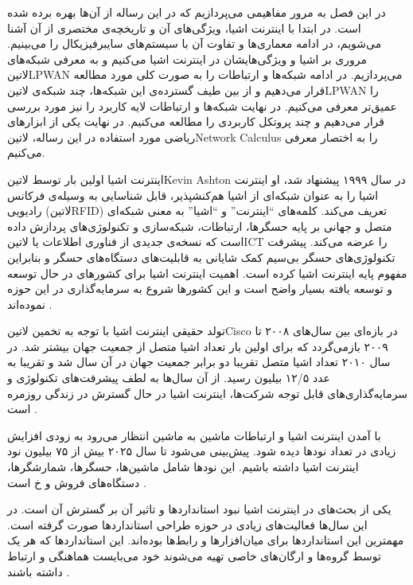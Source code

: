 
در این فصل به مرور مفاهیمی می‌پردازیم که در این رساله از آن‌ها بهره برده شده است. در ابتدا با اینترنت اشیا، ویژگی‌های آن و تاریخچه‌ی مختصری از آن آشنا می‌شویم،
در ادامه معماری‌ها و تفاوت آن با سیستم‌های سایبرفیزیکال را می‌بینیم. مروری بر اشیا و ویژگی‌هایشان در اینترنت اشیا می‌کنیم و به معرفی شبکه‌های ‌لاتین{LPWAN}
می‌پردازیم. در ادامه شبکه‌ها و ارتباطات را به صورت کلی مورد مطالعه قرار می‌دهیم و از بین طیف گسترده‌ی این شبکه‌ها، چند شبکه‌ی ‌لاتین{LPWAN} را عمیق‌تر
معرفی می‌کنیم. در نهایت شبکه‌ها و ارتباطات لایه کاربرد را نیز مورد بررسی قرار می‌دهیم و چند پروتکل کاربردی را مطالعه می‌کنیم. در نهایت یکی از ابزارهای ریاضی
مورد استفاده در این رساله، ‌لاتین{Network Calculus} را به اختصار معرفی می‌کنیم.


اینترنت اشیا اولین بار توسط ‌لاتین{Kevin Ashton} در سال ۱۹۹۹ پیشنهاد شد، او اینترنت اشیا را به عنوان
شبکه‌ای از اشیا هم‌کنشپذیر، قابل شناسایی به وسیله‌ی فرکانس رادیویی (‌لاتین{RFID}) تعریف می‌کند.
کلمه‌های ``اینترنت'' و ``اشیا'' به معنی شبکه‌ای متصل و جهانی بر پایه حسگرها، ارتباطات، شبکه‌سازی و تکنولوژی‌های پردازش داده است
که نسخه‌ی جدیدی از فناوری اطلاعات یا ‌لاتین{ICT} را عرضه می‌کند.
پیشرفت تکنولوژی‌های حسگر بی‌سیم کمک شایانی به قابلیت‌های دستگاه‌های حسگر و بنابراین مفهوم پایه اینترنت اشیا کرده است.
اهمیت اینترنت اشیا برای کشورهای در حال توسعه و توسعه یافته بسیار واضح است و این کشورها شروع به سرمایه‌گذاری در این حوزه نموده‌اند
.

تولد حقیقی اینترنت اشیا با توجه به تخمین ‌لاتین{Cisco} در بازه‌ای بین سال‌های ۲۰۰۸ تا ۲۰۰۹ بازمی‌گردد که برای اولین بار تعداد اشیا
متصل از جمعیت جهان بیشتر شد. در سال ۲۰۱۰ تعداد اشیا متصل تقریبا دو برابر جمعیت جهان در آن سال شد و تقریبا به عدد ۱۲/۵ بیلیون رسید.
از آن سال‌ها به لطف پیشرفت‌های تکنولوژی و سرمایه‌گذاری‌های قابل توجه شرکت‌ها، اینترنت اشیا در حال گسترش در زندگی روزمره است
.

با آمدن اینترنت اشیا و ارتباطات ماشین به ماشین انتظار می‌رود به زودی افزایش زیادی در تعداد نودها دیده شود. پیش‌بینی می‌شود تا سال ۲۰۲۵ بیش از ۷۵ بیلیون نود اینترنت اشیا داشته باشیم.
این نودها شامل ماشین‌ها، حسگرها، شمارشگرها، دستگاه‌های فروش و ‌خ است .

یکی از بحث‌های در اینترنت اشیا نبود استانداردها و تاثیر آن بر گسترش آن است. در این سال‌ها فعالیت‌های زیادی در حوزه طراحی استانداردها
صورت گرفته است. مهمترین این استانداردها برای میان‌افزارها و رابط‌ها بوده‌اند. این استانداردها که هر یک توسط گروه‌ها و ارگان‌های خاصی تهیه می‌شوند
خود می‌بایست هماهنگی و ارتباط داشته باشند
.

